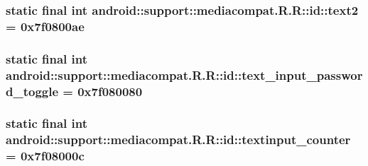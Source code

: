 \hypertarget{classandroid_1_1support_1_1mediacompat_1_1_r_1_1id_84361faa6513991dc45ed777b9cbe529}{
\subsubsection[{text2}]{\setlength{\rightskip}{0pt plus 5cm}static final int android::support::mediacompat.R.R::id::text2 = 0x7f0800ae}}
\label{classandroid_1_1support_1_1mediacompat_1_1_r_1_1id_84361faa6513991dc45ed777b9cbe529}


\hypertarget{classandroid_1_1support_1_1mediacompat_1_1_r_1_1id_8e53ac8853b5817c84828188edfab8e7}{
\subsubsection[{text\_\-input\_\-password\_\-toggle}]{\setlength{\rightskip}{0pt plus 5cm}static final int android::support::mediacompat.R.R::id::text\_\-input\_\-password\_\-toggle = 0x7f080080}}
\label{classandroid_1_1support_1_1mediacompat_1_1_r_1_1id_8e53ac8853b5817c84828188edfab8e7}


\hypertarget{classandroid_1_1support_1_1mediacompat_1_1_r_1_1id_6103a13421242140d45b06bbb9818c88}{
\subsubsection[{textinput\_\-counter}]{\setlength{\rightskip}{0pt plus 5cm}static final int android::support::mediacompat.R.R::id::textinput\_\-counter = 0x7f08000c}}
\label{classandroid_1_1support_1_1mediacompat_1_1_r_1_1id_6103a13421242140d45b06bbb9818c88}


